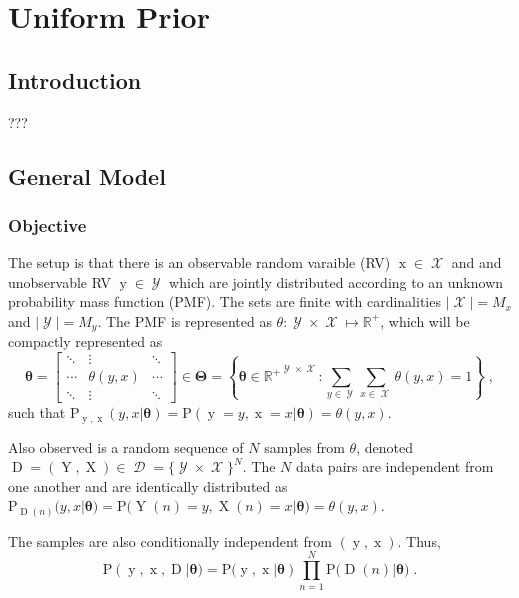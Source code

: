 \documentclass[12pt]{report}
\DeclareMathOperator{\xrm}{\mathrm{x}}
\DeclareMathOperator{\Xrm}{\mathrm{X}}
\DeclareMathOperator{\yrm}{\mathrm{y}}
\DeclareMathOperator{\Yrm}{\mathrm{Y}}
\DeclareMathOperator{\Drm}{\mathrm{D}}
\DeclareMathOperator{\Xcal}{\mathcal{X}}
\DeclareMathOperator{\Ycal}{\mathcal{Y}}
\DeclareMathOperator{\Dcal}{\mathcal{D}}
\begin{document}
\chapter{Uniform Prior}


\section{Introduction}

???



\section{General Model}



\subsection{Objective}

The setup is that there is an observable random varaible (RV) $\xrm \in \Xcal$ and and unobservable RV $\yrm \in \Ycal$ which are jointly distributed according to an unknown probability mass function (PMF). The sets are finite with cardinalities $|\Xcal| = M_x$ and $|\Ycal| = M_y$. The PMF is represented as $\theta : \Ycal \times \Xcal \mapsto \mathbb{R}^+$, which will be compactly represented as
\begin{equation}
\bm{\theta} = \begin{bmatrix} \ddots & \vdots & \ddots \\ \cdots & \theta(y,x) & \cdots \\ \ddots & \vdots & \ddots \end{bmatrix} 
\in \bm{\Theta} = \left\{ \bm{\theta} \in {\mathbb{R}^+}^{\Ycal \times \Xcal}: \sum_{y \in \Ycal} \sum_{x \in \Xcal}  \theta(y,x) = 1 \right\} \;,
\end{equation}
such that $\text{P}_{\yrm,\xrm}(y,x | \bm{\theta}) = \text{P}(\yrm = y, \xrm = x | \bm{\theta}) = \theta(y,x)$.

Also observed is a random sequence of $N$ samples from $\theta$, denoted $\Drm = ( \Yrm,\Xrm ) \in \Dcal = \{\Ycal \times \Xcal\}^N$. The $N$ data pairs are independent from one another and are identically distributed as $\text{P}_{\Drm(n)}(y,x | \bm{\theta}) = \text{P}\big( \Yrm(n) = y, \Xrm(n) = x | \bm{\theta} \big) = \theta(y,x)$. 

The samples are also conditionally independent from $(\yrm,\xrm)$. Thus,
\begin{equation}
\text{P}(\yrm,\xrm,\Drm | \bm{\theta}) = \text{P}(\yrm,\xrm | \bm{\theta}) \prod_{n=1}^N \text{P}\big( \Drm(n) | \bm{\theta} \big) \;.
\end{equation}
\end{document}
